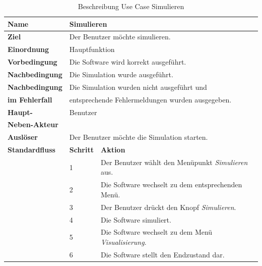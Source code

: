 \begin{table} [H]
        \centering
        \begin{tabular}{|l|l|l|}
                \hline
                \textbf{Name}           & \multicolumn{2}{|l|}{Simulieren}  \\
                \hline
                \textbf{Ziel}           & \multicolumn{2}{|l|}{Der Benutzer möchte simulieren. }\\ 
                \hline
                \textbf{Einordnung}     & \multicolumn{2}{|l|}{Hauptfunktion}\\
                \hline
                \textbf{Vorbedingung}   & \multicolumn{2}{|l|}{Die Software wird korrekt ausgeführt.} \\
                \hline
                \textbf{Nachbedingung}  & \multicolumn{2}{|l|}{Die Simulation wurde ausgeführt.}\\
                \hline
                \textbf{Nachbedingung}  & \multicolumn{2}{|l|}{Die Simulation wurden nicht ausgeführt und}\\
                \textbf{im Fehlerfall}  & \multicolumn{2}{|l|}{entsprechende Fehlermeldungen wurden ausgegeben.}\\
                \hline
                \textbf{Haupt-}                         & \multicolumn{2}{|l|}{Benutzer}\\
                \textbf{Neben-Akteur}   & \multicolumn{2}{|l|}{ }                       \\
                \hline
                \textbf{Auslöser}               & \multicolumn{2}{|l|}{Der Benutzer möchte die Simulation starten.} \\
                \hline 
                \textbf{Standardfluss} & \textbf{Schritt} & \textbf{Aktion} \\
                \hline
                &		1		& Der Benutzer wählt den Menüpunkt \emph{Simulieren} aus. \\
				\cline{2-3}
				&		2		& Die Software wechselt zu dem entsprechenden Menü.\\
				\cline{2-3}
                &       3 		& Der Benutzer drückt den Knopf \emph{Simulieren}. \\
                \cline{2-3}
                &       4       & Die Software simuliert.\\
                \cline{2-3}
                &       5       & Die Software wechselt zu dem Menü \emph{Visualisierung}.\\
                \cline{2-3}
                &       6      & Die Software stellt den Endzustand dar.\\
                \hline
        \end{tabular}
        \caption{Beschreibung Use Case Simulieren}
        \label{Beschreibung Use Case Simulieren}
\end{table}

